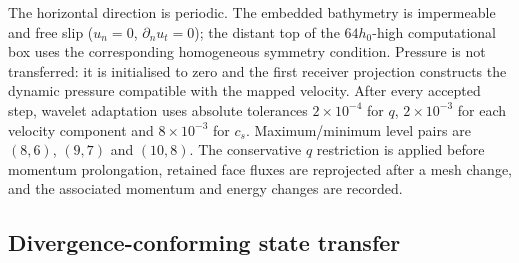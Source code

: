 \documentclass[11pt]{article}
\begin{document}
The horizontal direction is periodic.  The embedded bathymetry is
impermeable and free slip ($u_n=0$, $\partial_n u_t=0$); the distant top of the
$64h_0$-high computational box uses the corresponding homogeneous symmetry
condition.  Pressure is not transferred: it is initialised to zero and the
first receiver projection constructs the dynamic pressure compatible with the
mapped velocity.  After every accepted step, wavelet adaptation uses absolute
tolerances $2\times10^{-4}$ for $q$, $2\times10^{-3}$ for each velocity
component and $8\times10^{-3}$ for $c_s$.  Maximum/minimum level pairs are
$(8,6)$, $(9,7)$ and $(10,8)$.  The conservative $q$ restriction is applied
before momentum prolongation, retained face fluxes are reprojected after a
mesh change, and the associated momentum and energy changes are recorded.

\subsection{Divergence-conforming state transfer}
\end{document}

